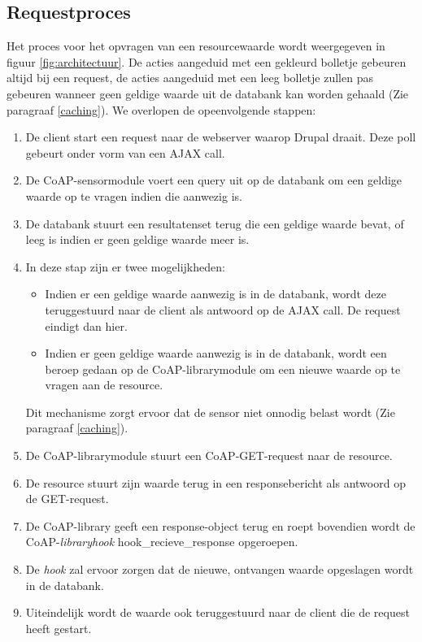 \subsection{Requestproces}
Het proces voor het opvragen van een resourcewaarde wordt weergegeven in figuur \ref{fig:architectuur}. De acties aangeduid met een gekleurd bolletje gebeuren altijd bij een request, de acties aangeduid met een leeg bolletje zullen pas gebeuren wanneer geen geldige waarde uit de databank kan worden gehaald (Zie paragraaf \ref{caching}). We overlopen de opeenvolgende stappen:
\begin{enumerate}
\item De client start een request naar de webserver waarop Drupal draait. Deze poll gebeurt onder vorm van een AJAX call.
\item De CoAP-sensormodule voert een query uit op de databank om een geldige waarde op te vragen indien die aanwezig is.
\item De databank stuurt een resultatenset terug die een geldige waarde bevat, of leeg is indien er geen geldige waarde meer is.
\item In deze stap zijn er twee mogelijkheden:
\begin{itemize}
\item Indien er een geldige waarde aanwezig is in de databank, wordt deze teruggestuurd naar de client als antwoord op de AJAX call. De request eindigt dan hier.
\item Indien er geen geldige waarde aanwezig is in de databank, wordt een beroep gedaan op de CoAP-librarymodule om een nieuwe waarde op te vragen aan de resource. 
\end{itemize}
Dit mechanisme zorgt ervoor dat de sensor niet onnodig belast wordt (Zie paragraaf \ref{caching}).
\item De CoAP-librarymodule stuurt een CoAP-GET-request naar de resource.
\item De resource stuurt zijn waarde terug in een responsebericht als antwoord op de GET-request.
\item De CoAP-library geeft een response-object terug en roept bovendien wordt de CoAP-\textit{library}\textit{hook} hook\_recieve\_response opgeroepen.
\item De \textit{hook} zal ervoor zorgen dat de nieuwe, ontvangen waarde opgeslagen wordt in de databank.
\item Uiteindelijk wordt de waarde ook teruggestuurd naar de client die de request heeft gestart.
\end{enumerate}
